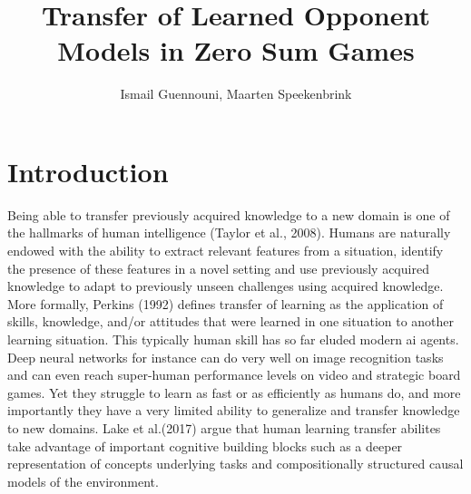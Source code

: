\documentclass[12pt]{article}         %
\title{Transfer of Learned Opponent Models in Zero Sum Games}  %
\author{Ismail Guennouni, Maarten Speekenbrink}             %
\begin{document}



\maketitle              %




\section*{Introduction}

Being able to transfer previously acquired knowledge to a new domain is one of the hallmarks of human intelligence (Taylor et al., 2008). Humans are naturally endowed with the ability to extract relevant features from a situation, identify the presence of these features in a novel setting and use previously acquired knowledge to adapt to previously unseen challenges using acquired knowledge. More formally, Perkins (1992) defines transfer of learning as the application of skills, knowledge, and/or attitudes that were learned in one situation to another learning situation. This typically human skill has so far eluded modern ai agents. Deep neural networks for instance can do very well on image recognition tasks and can even reach super-human performance levels on video and strategic board games. Yet they struggle to learn as fast or as efficiently as humans do, and more importantly they have a very limited ability to generalize and transfer knowledge to new domains. Lake et al.(2017) argue that human learning transfer abilites take advantage of important cognitive building blocks such as a deeper representation of concepts underlying tasks and compositionally structured causal models of the environment.
\end{document}
